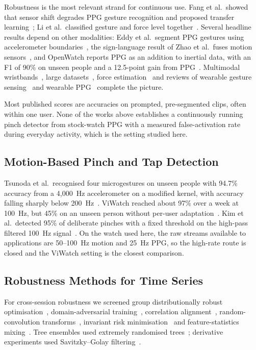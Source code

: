 Robustness is the most relevant strand for continuous use. Fang et al.\ showed that sensor shift degrades PPG gesture recognition and proposed transfer learning~\cite{fang2023shift}; Li et al.\ classified gesture and force level together~\cite{li2023force}. Several headline results depend on other modalities: Eddy et al.\ segment PPG gestures using accelerometer boundaries~\cite{eddy2024multimodal}, the sign-language result of Zhao et al.\ fuses motion sensors~\cite{zhao2021sign}, and OpenWatch reports PPG as an addition to inertial data, with an F1 of 90\% on unseen people and a 12.5-point gain from PPG~\cite{bonazzi2026openwatch}. Multimodal wristbands~\cite{wang2022wristband,multimodal2026emg}, large datasets~\cite{hauptmann2026mudpad}, force estimation~\cite{hu2026watchforce} and reviews of wearable gesture sensing~\cite{tchantchane2023review} and wearable PPG~\cite{charlton2023roadmap} complete the picture.

Most published scores are accuracies on prompted, pre-segmented clips, often within one user. None of the works above establishes a continuously running pinch detector from stock-watch PPG with a measured false-activation rate during everyday activity, which is the setting studied here.

\subsection{Motion-Based Pinch and Tap Detection}

Tsunoda et al.\ recognised four microgestures on unseen people with 94.7\% accuracy from a 4{,}000~Hz accelerometer on a modified kernel, with accuracy falling sharply below 200~Hz~\cite{tsunoda2024}. ViWatch reached about 97\% over a week at 100~Hz, but 45\% on an unseen person without per-user adaptation~\cite{viwatch2023}. Kim et al.\ detected 95\% of deliberate pinches with a fixed threshold on the high-pass filtered 100~Hz signal~\cite{kim2025pinch}. On the watch used here, the raw streams available to applications are 50--100~Hz motion and 25~Hz PPG, so the high-rate route is closed and the ViWatch setting is the closest comparison.

\subsection{Robustness Methods for Time Series}

For cross-session robustness we screened group distributionally robust optimisation~\cite{sagawa2019dro}, domain-adversarial training~\cite{ganin2015dann}, correlation alignment~\cite{sun2016coral}, random-convolution transforms~\cite{dempster2020minirocket}, invariant risk minimisation~\cite{arjovsky2019irm} and feature-statistics mixing~\cite{zhou2021mixstyle}. Tree ensembles used extremely randomised trees~\cite{geurts2006extra,sklearn}; derivative experiments used Savitzky--Golay filtering~\cite{savitzky1964}.

